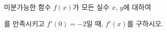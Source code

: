 미분가능한 함수 $f(x)$가 모든 실수 $x$, $y$에 대하여 \par\smallskip{}\par\smallskip\noindent 를 만족시키고 $f'(0)=-2$일 때, $f'(x)$를 구하시오.
